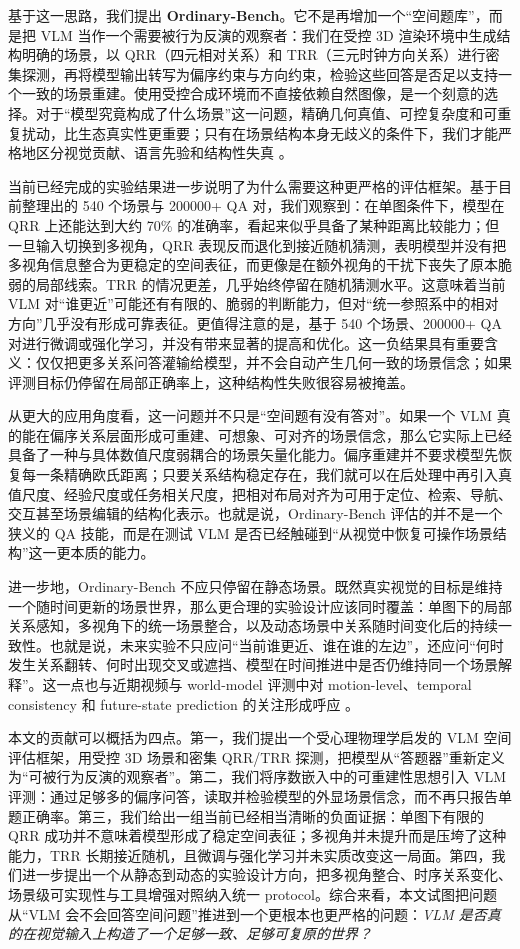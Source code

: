 基于这一思路，我们提出 \textbf{Ordinary-Bench}。它不是再增加一个“空间题库”，而是把 VLM 当作一个需要被行为反演的观察者：我们在受控 3D 渲染环境中生成结构明确的场景，以 QRR（四元相对关系）和 TRR（三元时钟方向关系）进行密集探测，再将模型输出转写为偏序约束与方向约束，检验这些回答是否足以支持一个一致的场景重建。使用受控合成环境而不直接依赖自然图像，是一个刻意的选择。对于“模型究竟构成了什么场景”这一问题，精确几何真值、可控复杂度和可重复扰动，比生态真实性更重要；只有在场景结构本身无歧义的条件下，我们才能严格地区分视觉贡献、语言先验和结构性失真 \cite{johnson2017clevr,yi2020clevrer}。

当前已经完成的实验结果进一步说明了为什么需要这种更严格的评估框架。基于目前整理出的 540 个场景与 200000+ QA 对，我们观察到：在单图条件下，模型在 QRR 上还能达到大约 70\% 的准确率，看起来似乎具备了某种距离比较能力；但一旦输入切换到多视角，QRR 表现反而退化到接近随机猜测，表明模型并没有把多视角信息整合为更稳定的空间表征，而更像是在额外视角的干扰下丧失了原本脆弱的局部线索。TRR 的情况更差，几乎始终停留在随机猜测水平。这意味着当前 VLM 对“谁更近”可能还有有限的、脆弱的判断能力，但对“统一参照系中的相对方向”几乎没有形成可靠表征。更值得注意的是，基于 540 个场景、200000+ QA 对进行微调或强化学习，并没有带来显著的提高和优化。这一负结果具有重要含义：仅仅把更多关系问答灌输给模型，并不会自动产生几何一致的场景信念；如果评测目标仍停留在局部正确率上，这种结构性失败很容易被掩盖。

从更大的应用角度看，这一问题并不只是“空间题有没有答对”。如果一个 VLM 真的能在偏序关系层面形成可重建、可想象、可对齐的场景信念，那么它实际上已经具备了一种与具体数值尺度弱耦合的场景矢量化能力。偏序重建并不要求模型先恢复每一条精确欧氏距离；只要关系结构稳定存在，我们就可以在后处理中再引入真值尺度、经验尺度或任务相关尺度，把相对布局对齐为可用于定位、检索、导航、交互甚至场景编辑的结构化表示。也就是说，Ordinary-Bench 评估的并不是一个狭义的 QA 技能，而是在测试 VLM 是否已经触碰到“从视觉中恢复可操作场景结构”这一更本质的能力。

进一步地，Ordinary-Bench 不应只停留在静态场景。既然真实视觉的目标是维持一个随时间更新的场景世界，那么更合理的实验设计应该同时覆盖：单图下的局部关系感知，多视角下的统一场景整合，以及动态场景中关系随时间变化后的持续一致性。也就是说，未来实验不只应问“当前谁更近、谁在谁的左边”，还应问“何时发生关系翻转、何时出现交叉或遮挡、模型在时间推进中是否仍维持同一个场景解释”。这一点也与近期视频与 world-model 评测中对 motion-level、temporal consistency 和 future-state prediction 的关注形成呼应 \cite{hong2025motionbench,fu2024videomme,zhou2024mlvu,liu2024tempcompass,gao2025wmabench}。

本文的贡献可以概括为四点。第一，我们提出一个受心理物理学启发的 VLM 空间评估框架，用受控 3D 场景和密集 QRR/TRR 探测，把模型从“答题器”重新定义为“可被行为反演的观察者”。第二，我们将序数嵌入中的可重建性思想引入 VLM 评测：通过足够多的偏序问答，读取并检验模型的外显场景信念，而不再只报告单题正确率。第三，我们给出一组当前已经相当清晰的负面证据：单图下有限的 QRR 成功并不意味着模型形成了稳定空间表征；多视角并未提升而是压垮了这种能力，TRR 长期接近随机，且微调与强化学习并未实质改变这一局面。第四，我们进一步提出一个从静态到动态的实验设计方向，把多视角整合、时序关系变化、场景级可实现性与工具增强对照纳入统一 protocol。综合来看，本文试图把问题从“VLM 会不会回答空间问题”推进到一个更根本也更严格的问题：\emph{VLM 是否真的在视觉输入上构造了一个足够一致、足够可复原的世界？}
